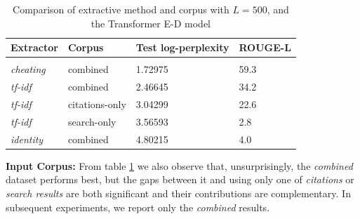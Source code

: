 \begin{table}[t]
\caption{Comparison of extractive method and corpus with $L=500$, and
	the Transformer E-D model}
\label{ext-input-perf}
\begin{center}
\begin{tabular}{llll}
\multicolumn{1}{l}{\bf Extractor}
	&\multicolumn{1}{l}{\bf Corpus}
	&\multicolumn{1}{l}{\bf Test log-perplexity}
	&\multicolumn{1}{l}{\bf ROUGE-L}
\\ \hline \\
	\textit{cheating} & combined & 1.72975  & 59.3 \\
	\textit{tf-idf} & combined & 2.46645 & 34.2 \\
	\textit{tf-idf} & citations-only  & 3.04299  & 22.6 \\
	\textit{tf-idf} & search-only & 3.56593  & 2.8 \\
	\textit{identity} & combined & 4.80215  & 4.0 \\
\end{tabular}
\end{center}
\end{table}

\textbf{Input Corpus:}
From table \ref{ext-input-perf} we also observe that, unsurprisingly,
the \textit{combined} dataset performs best, but the gaps between it and using
only one of \textit{citations} or \textit{search results} are both significant
and their contributions are
complementary. In subsequent experiments, we report only the \textit{combined} results.



